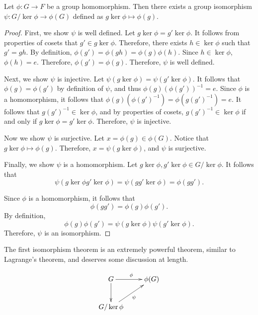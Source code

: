 
\begin{theorem}\label{thm:OWOWOWOWO}
	Let $\phi : G \to F$ be a group homomorphism. Then there exists a group isomorphism $\psi : G / \ker \phi  \to \phi (G)$ defined as $g\ker \phi \mapsto \phi (g)$.
\end{theorem}
\begin{proof}
	First, we show $\psi $ is well defined. Let $g\ker \phi =g'\ker \phi $. It follows from properties of cosets that $g'\in g\ker \phi $. Therefore, there exists $h\in \ker \phi $ such that $g'=gh$. By definition, $\phi (g')=\phi (gh)=\phi (g)\phi (h)$. Since $h\in \ker \phi $, $\phi (h)=e$. Therefore, $\phi (g')=\phi (g)$. Therefore, $\psi $ is well defined.

	Next, we show $\psi $ is injective. Let $\psi (g\ker \phi )=\psi (g'\ker \phi )$. It follows that $\phi (g)=\phi (g')$ by definition of $\psi $, and thus $\phi (g)\left( \phi (g') \right) ^{-1}=e$. Since $\phi $ is a homomorphism, it follows that $\phi (g)(\phi (g')^{-1})=\phi (g(g')^{-1})=e$. It follows that $g(g')^{-1}\in \ker \phi $, and by properties of cosets, $g(g')^{-1}\in \ker \phi $ if and only if $g\ker \phi =g'\ker \phi $. Therefore, $\psi $ is injective.

	Now we show $\psi $ is surjective. Let $x=\phi (g)\in\phi (G)$. Notice that $g\ker \phi \mapsto \phi (g)$. Therefore, $x=\psi (g\ker \phi  )$, and $\psi $ is surjective.

	Finally, we show $\psi $ is a homomorphism. Let $g\ker \phi ,g'\ker \phi \in G / \ker \phi $. It follows that
	\[
		\psi \left( g\ker \phi g'\ker \phi  \right) =\psi \left(gg'\ker \phi \right)=\phi \left( gg' \right) 
	.\]
	
	Since $\phi $ is a homomorphism, it follows that
	\[
		\phi (gg')=\phi (g)\phi \left( g'\right) 
	.\]
	By definition,
	\[
		\phi (g)\phi \left( g' \right) =\psi (g\ker \phi )\psi \left( g'\ker \phi  \right) 
	.\]
	Therefore, $\psi $ is an isomorphism.
\end{proof}

The first isomorphism theorem is an extremely powerful theorem, similar to Lagrange's theorem, and deserves some discussion at length.

\[\xymatrix{\ar @{} [dr] 
		G \ar[d] \ar[r]^{\phi} & \phi(G) \\
G / \ker \phi \ar[ur]_{\psi } & }\]

